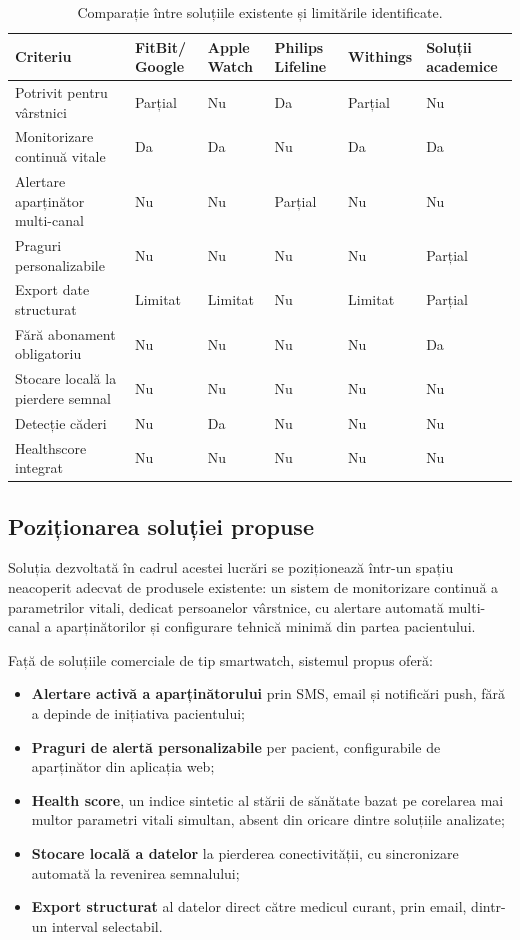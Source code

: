 ﻿\documentclass[12pt,a4paper,twoside]{article}
\begin{document}
\begin{table}[H]
\centering
\small
\renewcommand{\arraystretch}{1.3}
\begin{tabular}{|>{\raggedright\arraybackslash}p{3.0cm}|p{1.7cm}|p{1.7cm}|p{1.9cm}|p{1.5cm}|p{1.9cm}|}
\hline
\textbf{Criteriu} & \textbf{FitBit/ Google} & \textbf{Apple Watch} & \textbf{Philips Lifeline} & \textbf{Withings} & \textbf{Soluții academice}\\
\hline
Potrivit pentru vârstnici & Parțial & Nu & Da & Parțial & Nu\\
\hline
Monitorizare continuă vitale & Da & Da & Nu & Da & Da\\
\hline
Alertare aparținător multi-canal & Nu & Nu & Parțial & Nu & Nu\\
\hline
Praguri personalizabile & Nu & Nu & Nu & Nu & Parțial\\
\hline
Export date structurat & Limitat & Limitat & Nu & Limitat & Parțial\\
\hline
Fără abonament obligatoriu & Nu & Nu & Nu & Nu & Da\\
\hline
Stocare locală la pierdere semnal & Nu & Nu & Nu & Nu & Nu\\
\hline
Detecție căderi & Nu & Da & Nu & Nu & Nu\\
\hline
Healthscore integrat & Nu & Nu & Nu & Nu & Nu\\
\hline
\end{tabular}
\caption{Comparație între soluțiile existente și limitările identificate.}
\label{tab:comparatie}
\end{table}

\subsection{Poziționarea soluției propuse}

Soluția dezvoltată în cadrul acestei lucrări se poziționează într-un spațiu neacoperit adecvat de produsele existente: un sistem de monitorizare continuă a parametrilor vitali, dedicat persoanelor vârstnice, cu alertare automată multi-canal a aparținătorilor și configurare tehnică minimă din partea pacientului.

Față de soluțiile comerciale de tip smartwatch, sistemul propus oferă:

\begin{itemize}[leftmargin=1.5em]
\item \textbf{Alertare activă a aparținătorului} prin SMS, email și notificări push, fără a depinde de inițiativa pacientului;
\item \textbf{Praguri de alertă personalizabile} per pacient, configurabile de aparținător din aplicația web;
\item \textbf{Health score}, un indice sintetic al stării de sănătate bazat pe corelarea mai multor parametri vitali simultan, absent din oricare dintre soluțiile analizate;
\item \textbf{Stocare locală a datelor} la pierderea conectivității, cu sincronizare automată la revenirea semnalului;
\item \textbf{Export structurat} al datelor direct către medicul curant, prin email, dintr-un interval selectabil.
\end{itemize}
\end{document}
